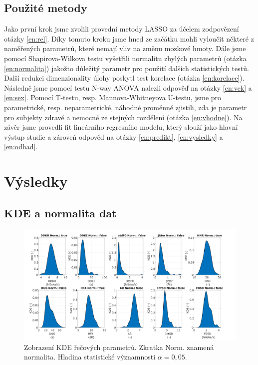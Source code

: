 \documentclass[11pt,a4paper]{article}
\begin{document}
        \subsection{Použité metody}
            Jako první krok jsme zvolili provední metody LASSO za účelem zodpovězení otázky \ref{en:rel}. Díky tomuto kroku jsme hned ze začátku mohli vyloučit některé z naměřených parametrů, které nemají vliv na změnu mozkové hmoty. Dále jsme pomocí Shapirova-Wilkova testu vyšetřili normalitu zbylých parametrů (otázka \ref{en:normalita}) jakožto důležitý parametr pro použití dalších statistických testů. Další redukci dimenzionality úlohy poskytl test korelace (otázka \ref{en:korelace}). Následně jsme pomocí testu N-way ANOVA nalezli odpověď na otázky \ref{en:vek} a \ref{en:sex}. Pomocí T-testu, resp. Mannova-Whitneyova U-testu, jsme pro parametrické, resp. neparametrické, náhodné proměnné zjistili, zda je parametr pro subjekty zdravé a nemocné ze stejných rozdělení (otázka \ref{en:vhodne}). Na závěr jsme provedli fit lineárního regresního modelu, který slouží jako hlavní výstup studie a zároveň odpověď na otázky \ref{en:predikt}, \ref{en:vysledky} a \ref{en:odhad}.
	
	\section{Výsledky}
        \subsection{KDE a normalita dat}
            \begin{figure}[!ht] %
                \centering
                \includegraphics[width=\textwidth]{src/kde.pdf}
                \caption{Zobrazení KDE řečových parametrů. Zkratka Norm. znamená normalita. Hladina statistické významnosti $\alpha=0,05$.}
                \label{fig:kde}
            \end{figure}
            
\end{document}
